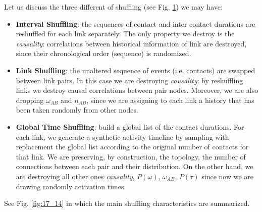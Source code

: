 \documentclass[../main/main.tex]{subfiles}
\begin{document}
\begin{figure}[h!]
\begin{minipage}[c]{0.5\linewidth}
\end{minipage}
\begin{minipage}[]{0.5\linewidth}
\centering
{}
\end{minipage}
\caption{\label{fig:17_15} }
\end{figure}


Let us discuss the three different of shuffling (see Fig. \ref{fig:17_15}) we may have:
\begin{itemize}
    \item \textbf{Interval Shuffling}: the sequences of contact and inter-contact durations are reshuffled for each link separately. The only property we destroy is the \textit{causality}: correlations between historical information of link are destroyed, since their chronological order (sequence) is randomized.
    \item \textbf{Link Shuffling}: the unaltered sequence of events (i.e. contacts) are swapped between link pairs. In this case we are destroying \textit{causality}: by reshuffling links we destroy causal correlations between pair nodes. Moreover, we are also dropping $\omega_{AB}$ and $n_{AB}$, since we are assigning to each link a history that has been taken randomly from other nodes.
    \item \textbf{Global Time Shuffling}: build a global list of the contact durations. For each link, we generate a synthetic activity timeline by sampling with replacement the global list according to the original number of contacts for that link. We are preserving, by construction, the topology, the number of connections between each pair and their distribution. On the other hand, we are destroying all other ones \textit{causality}, $P(\omega)$, $\omega_{AB}$, $P(\tau)$ since now we are drawing randomly activation times.
\end{itemize}
See Fig. \ref{fig:17_14} in which the main shuffling characteristics are summarized.
\end{document}
